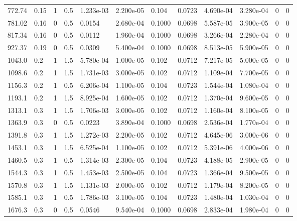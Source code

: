 \documentclass[preview]{standalone}
\begin{document}
{{\begin{tabular}{L{1.2cm}C{1.2cm} C{0.3cm}C{0.5cm} C{1.4cm}C{1.4cm} C{1.4cm}C{1.4cm} C{1.6cm}C{1.6cm} C{1.6cm}C{1.6cm}}
  772.74  &  0.15  & 1     & 0.5 &  1.233e-03  & 2.200e-05  &  0.104&   0.0723& 4.690e-04 & 3.280e-04   &  0 & 0  \\ 
  781.02  &  0.16  & 0     & 0.5 &  0.0154  & 2.680e-04  &  0.1000&   0.0698& 5.587e-05 & 3.900e-05   &  0 & 0  \\ 
  817.34  &  0.16  & 0     & 0.5 &  0.0112  & 1.960e-04  &  0.1000&   0.0698& 3.266e-04 & 2.280e-04   &  0 & 0  \\ 
  927.37  &  0.19  & 0     & 0.5 &  0.0309  & 5.400e-04  &  0.1000&   0.0698& 8.513e-05 & 5.900e-05   &  0 & 0  \\ 
  1043.0  &   0.2  & 1     & 1.5 &  5.780e-04  & 1.000e-05  &  0.102&   0.0712& 7.217e-05 & 5.000e-05   &  0 & 0  \\ 
  1098.6  &   0.2  & 1     & 1.5 &  1.731e-03  & 3.000e-05  &  0.102&   0.0712& 1.109e-04 & 7.700e-05   &  0 & 0  \\ 
  1156.3  &   0.2  & 1     & 0.5 &  6.206e-04  & 1.100e-05  &  0.104&   0.0723& 1.544e-04 & 1.080e-04   &  0 & 0  \\ 
  1193.1  &   0.2  & 1     & 1.5 &  8.925e-04  & 1.600e-05  &  0.102&   0.0712& 1.370e-04 & 9.600e-05   &  0 & 0  \\ 
  1313.1  &   0.3  & 1     & 1.5 &  1.706e-03  & 3.000e-05  &  0.102&   0.0712& 1.160e-04 & 8.100e-05   &  0 & 0  \\ 
  1363.9  &   0.3  & 0     & 0.5 &  0.0223  & 3.890e-04  &  0.1000&   0.0698& 2.536e-04 & 1.770e-04   &  0 & 0  \\ 
  1391.8  &   0.3  & 1     & 1.5 &  1.272e-03  & 2.200e-05  &  0.102&   0.0712& 4.645e-06 & 3.000e-06   &  0 & 0  \\ 
  1453.1  &   0.3  & 1     & 1.5 &  6.525e-04  & 1.100e-05  &  0.102&   0.0712& 5.391e-06 & 4.000e-06   &  0 & 0  \\ 
  1460.5  &   0.3  & 1     & 0.5 &  1.314e-03  & 2.300e-05  &  0.104&   0.0723& 4.188e-05 & 2.900e-05   &  0 & 0  \\ 
  1544.3  &   0.3  & 1     & 0.5 &  1.453e-03  & 2.500e-05  &  0.104&   0.0723& 1.366e-04 & 9.500e-05   &  0 & 0  \\ 
  1570.8  &   0.3  & 1     & 1.5 &  1.131e-03  & 2.000e-05  &  0.102&   0.0712& 1.179e-04 & 8.200e-05   &  0 & 0  \\ 
  1585.1  &   0.3  & 1     & 0.5 &  1.786e-03  & 3.100e-05  &  0.104&   0.0723& 1.480e-04 & 1.030e-04   &  0 & 0  \\ 
  1676.3  &   0.3  & 0     & 0.5 &  0.0546  & 9.540e-04  &  0.1000&   0.0698& 2.833e-04 & 1.980e-04   &  0 & 0  \\ 

\end{tabular}}}
\end{document}
